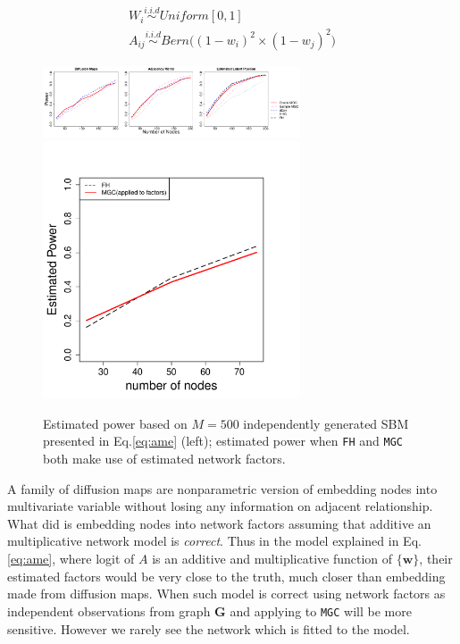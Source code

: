 \documentclass[12pt]{article}
\theoremstyle{definition}
\begin{document}
\begin{equation}
\label{eq:ame}
\begin{gathered}
	W_{i} \overset{i.i.d}{\sim} Uniform[0,1] \\ 
	A_{ij}  \overset{i.i.d}{\sim} Bern \big(  ( 1 - w_{i})^2 \times (1 - w_{j})^2    \big)
\end{gathered}
\end{equation}


\begin{figure}[H]
	\centering
	\label{fig:ame}
	\includegraphics[width=3in]{../Figure/ame.pdf}
	\includegraphics[width=3in]{../Figure/ame_factor.pdf}
	\caption{Estimated power based on $M = 500$ independently generated SBM presented in Eq.\ref{eq:ame} (left); estimated power when \texttt{FH} and \texttt{MGC} both make use of estimated network factors.}
\end{figure}


A family of diffusion maps are nonparametric version of embedding nodes into multivariate variable without losing any information on adjacent relationship. What \cite{fosdick2015testing} did is embedding nodes into network factors assuming that additive an multiplicative network model is \textit{correct}. Thus in the model explained in Eq. \ref{eq:ame}, where logit of $A$ is an additive and multiplicative function of $\{\mathbf{w} \}$, their estimated factors would be very close to the truth, much closer than embedding made from diffusion maps. When such model is correct using network factors as independent observations from graph $\mathbf{G}$ and applying to \texttt{MGC} will be more sensitive. However we rarely see the network which is fitted to the model.
\end{document}
